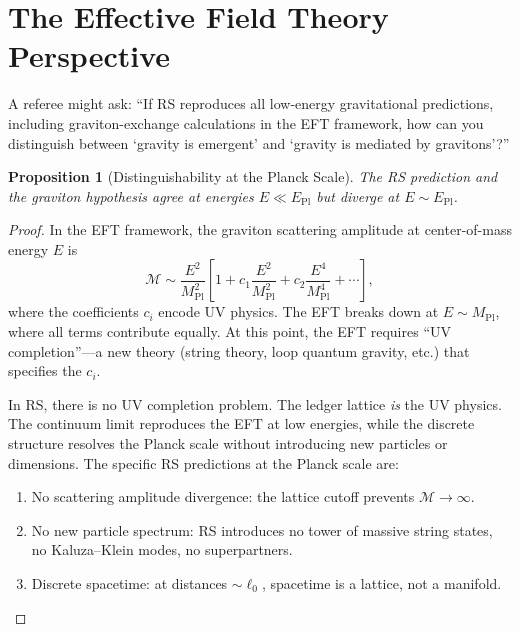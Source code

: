 \documentclass[12pt,a4paper]{article}
\newtheorem{proposition}[theorem]{Proposition}
\theoremstyle{definition}
\theoremstyle{remark}
\begin{document}
\section{The Effective Field Theory Perspective}
\label{sec:eft}

A referee might ask: ``If RS reproduces all low-energy gravitational
predictions, including graviton-exchange calculations in the EFT
framework, how can you distinguish between `gravity is emergent' and
`gravity is mediated by gravitons'?''

\begin{proposition}[Distinguishability at the Planck Scale]
\label{prop:eft}
The RS prediction and the graviton hypothesis agree at energies
$E \ll E_{\mathrm{Pl}}$ but diverge at $E \sim E_{\mathrm{Pl}}$.
\end{proposition}

\begin{proof}
In the EFT framework, the graviton scattering amplitude at
center-of-mass energy $E$ is
\begin{equation}
  \mathcal{M} \sim \frac{E^2}{M_{\mathrm{Pl}}^2}
  \left[1 + c_1 \frac{E^2}{M_{\mathrm{Pl}}^2} +
  c_2 \frac{E^4}{M_{\mathrm{Pl}}^4} + \cdots\right],
\end{equation}
where the coefficients $c_i$ encode UV physics.  The EFT breaks
down at $E \sim M_{\mathrm{Pl}}$, where all terms contribute
equally.  At this point, the EFT requires ``UV completion''---a
new theory (string theory, loop quantum gravity, etc.) that
specifies the $c_i$.

In RS, there is no UV completion problem.  The ledger lattice
\emph{is} the UV physics.  The continuum limit reproduces the EFT
at low energies, while the discrete structure resolves the Planck
scale without introducing new particles or dimensions.  The
specific RS predictions at the Planck scale are:
\begin{enumerate}[label=(\roman*)]
  \item No scattering amplitude divergence: the lattice cutoff
        prevents $\mathcal{M} \to \infty$.
  \item No new particle spectrum: RS introduces no tower of
        massive string states, no Kaluza--Klein modes, no
        superpartners.
  \item Discrete spacetime: at distances $\sim \ell_0$, spacetime
        is a lattice, not a manifold.
\end{enumerate}
\end{proof}
\end{document}
